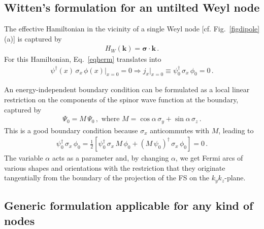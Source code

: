 \documentclass[aps,prb,onecolumn, footinbib, 10pt]{revtex4-2}
\begin{document}
\subsection{Witten's formulation for an untilted Weyl node}
\label{secwit}

The effective Hamiltonian in the vicinity of a single Weyl node [cf. Fig.~\ref{figdipole}(a)] is captured by
\begin{align}
\label{eqweyl}
H_W (\boldsymbol k) = \boldsymbol{\sigma} \cdot {\boldsymbol k}\,.
\end{align}
For this Hamiltonian, Eq.~\eqref{eqherm} translates into
\begin{align}
\label{eqjxweyl}
\psi^\dagger (x)\, \sigma_x \, \phi (x) \vert_{x=0} = 0
\Rightarrow j_x\vert_{x=0} \equiv \psi_0^\dagger\, \sigma_x \, \phi_0  = 0\,.
\end{align}

An energy-independent
boundary condition can be formulated as a local linear restriction on the components of the spinor wave function at the boundary, captured by \cite{witten}
\begin{align}
\label{eqalpha}
\Psi_0 =  M \, \Psi_0\,, \text{ where } M = \cos \alpha \, \sigma_y + \sin  \alpha \, \sigma_z \,.
\end{align}
This is a good boundary condition because $\sigma_x $ anticommutes with $M$, leading to
\begin{align}
 \psi_0^\dagger\, \sigma_x \, \phi_0 = 
 \frac{1}{2} \left[ \psi_0^\dagger\, \sigma_x \,M\, \phi_0 
 + ( M\, \psi_0)^\dagger\, \sigma_x \, \phi_0 \right ]
  = 0\,.
\end{align}
The variable $\alpha $ acts as a parameter and, by changing $\alpha$, we get Fermi arcs of various shapes and orientations with the restriction that they originate tangentially from the boundary of the projection of the FS on the $k_y k_z$-plane.


\subsection{Generic formulation applicable for any kind of nodes}
\label{secgen_method}
\end{document}
